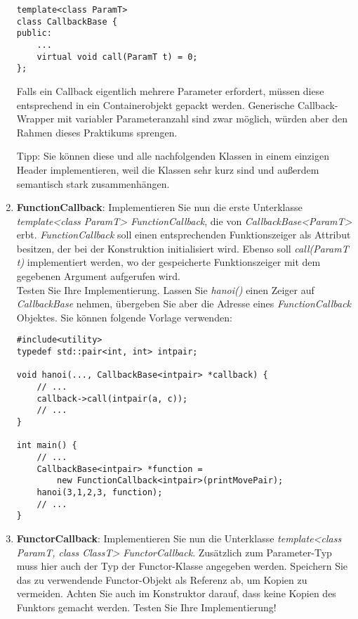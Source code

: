\documentclass[
  accentcolor=tud1c,	%
  colorbacktitle,		%
  inverttitle,			%
  german,				%
  twoside
]{tudexercise}
\begin{document}
\begin{enumerate}
\begin{lstlisting}
template<class ParamT>
class CallbackBase {
public:
	...
	virtual void call(ParamT t) = 0;
};
\end{lstlisting} 

Falls ein Callback eigentlich mehrere Parameter erfordert, müssen diese entsprechend in ein Containerobjekt gepackt werden. Generische Callback-Wrapper mit variabler Parameteranzahl sind zwar möglich, würden aber den Rahmen dieses Praktikums sprengen.

Tipp: Sie können diese und alle nachfolgenden Klassen in einem einzigen Header implementieren, weil die Klassen sehr kurz sind und außerdem semantisch stark zusammenhängen.


\item
\textbf{FunctionCallback}:
Implementieren Sie nun die erste Unterklasse \emph{template<class ParamT> FunctionCallback}, die von \emph{CallbackBase<ParamT>} erbt.  \emph{FunctionCallback} soll einen entsprechenden Funktionszeiger als Attribut besitzen, der bei der Konstruktion initialisiert wird. Ebenso soll \emph{call(ParamT t)} implementiert werden, wo der gespeicherte Funktionszeiger mit dem gegebenen Argument aufgerufen wird. \\

Testen Sie Ihre Implementierung. Lassen Sie \emph{hanoi()} einen Zeiger auf \emph{CallbackBase} nehmen, übergeben Sie aber die Adresse eines \emph{FunctionCallback} Objektes.
Sie können folgende Vorlage verwenden:
\begin{lstlisting}
#include<utility>
typedef std::pair<int, int> intpair;

void hanoi(..., CallbackBase<intpair> *callback) {
	// ...
	callback->call(intpair(a, c));
	// ...
}

int main() {
	// ...
	CallbackBase<intpair> *function = 
	    new FunctionCallback<intpair>(printMovePair);
	hanoi(3,1,2,3, function);
	// ...
}
\end{lstlisting}


\item
\textbf{FunctorCallback}:
Implementieren Sie nun die Unterklasse \emph{template<class ParamT, class ClassT> FunctorCallback}. Zusätzlich zum Parameter-Typ muss hier auch der Typ der Functor-Klasse angegeben werden. Speichern Sie das zu verwendende Functor-Objekt als Referenz ab, um Kopien zu vermeiden. Achten Sie auch im Konstruktor darauf, dass keine Kopien des Funktors gemacht werden. Testen Sie Ihre Implementierung! 




\end{enumerate}
\end{document}
